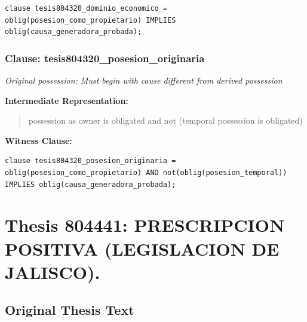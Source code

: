 \documentclass[11pt,a4paper]{article}
\begin{document}
\begin{lstlisting}[style=witnessstyle, language=Witness]
clause tesis804320_dominio_economico = oblig(posesion_como_propietario) IMPLIES oblig(causa_generadora_probada);
\end{lstlisting}

\subsubsection{Clause: tesis804320\_posesion\_originaria}

\textit{Original possession: Must begin with cause different from derived possession}

\textbf{Intermediate Representation:}

\begin{quote}
possession as owner is obligated and not (temporal possession is obligated)
\end{quote}

\textbf{Witness Clause:}

\begin{lstlisting}[style=witnessstyle, language=Witness]
clause tesis804320_posesion_originaria = oblig(posesion_como_propietario) AND not(oblig(posesion_temporal)) IMPLIES oblig(causa_generadora_probada);
\end{lstlisting}

\newpage

\section{Thesis 804441: PRESCRIPCION POSITIVA (LEGISLACION DE JALISCO).}
\label{thesis:804441}

\subsection{Original Thesis Text}
\end{document}

